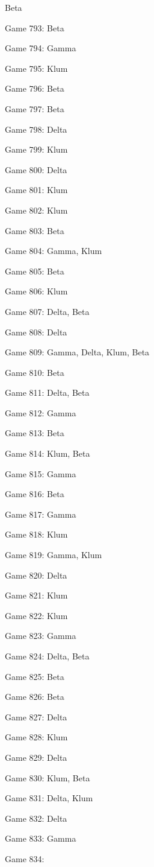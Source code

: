\documentclass{article}
\begin{document}
\begin{multicols}{3}
\begin{compactitem}
Beta
\item Game 793:
Beta
\item Game 794:
Gamma
\item Game 795:
Klum
\item Game 796:
Beta
\item Game 797:
Beta
\item Game 798:
Delta
\item Game 799:
Klum
\item Game 800:
Delta
\item Game 801:
Klum
\item Game 802:
Klum
\item Game 803:
Beta
\item Game 804:
Gamma, Klum
\item Game 805:
Beta
\item Game 806:
Klum
\item Game 807:
Delta, Beta
\item Game 808:
Delta
\item Game 809:
Gamma, Delta, Klum, Beta
\item Game 810:
Beta
\item Game 811:
Delta, Beta
\item Game 812:
Gamma
\item Game 813:
Beta
\item Game 814:
Klum, Beta
\item Game 815:
Gamma
\item Game 816:
Beta
\item Game 817:
Gamma
\item Game 818:
Klum
\item Game 819:
Gamma, Klum
\item Game 820:
Delta
\item Game 821:
Klum
\item Game 822:
Klum
\item Game 823:
Gamma
\item Game 824:
Delta, Beta
\item Game 825:
Beta
\item Game 826:
Beta
\item Game 827:
Delta
\item Game 828:
Klum
\item Game 829:
Delta
\item Game 830:
Klum, Beta
\item Game 831:
Delta, Klum
\item Game 832:
Delta
\item Game 833:
Gamma
\item Game 834:

\end{compactitem}
\end{multicols}
\end{document}
